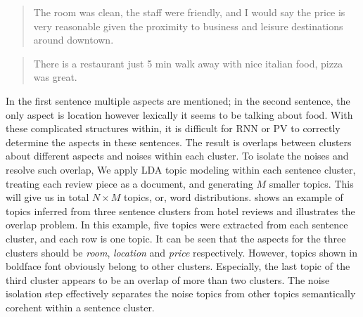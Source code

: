 \begin{quote}
The room was clean, the staff were friendly, and I would say the price is very reasonable given the proximity to business and leisure destinations around downtown.
\end{quote}

\begin{quote}
There is a restaurant just 5 min walk away with nice italian food, pizza was great.
\end{quote}

In the first sentence multiple aspects are mentioned; in the second sentence, the only aspect is location however lexically it seems to be talking about food.
With these complicated structures within, 
it is difficult for RNN or PV to correctly determine the aspects 
in these sentences. The result is overlaps between clusters about 
different aspects and noises within each cluster.
To isolate the noises and resolve such overlap, 
We apply LDA \cite{blei2003latent} topic modeling within each sentence cluster, 
treating each review piece as a document, and generating $M$ smaller topics. 
This will give us in total $N\times M$ topics, or, word distributions. 
 shows an example of topics inferred from three
sentence clusters from hotel reviews and illustrates the overlap problem.
In this example, five topics were extracted from each sentence cluster, 
and each row is one topic. It can be seen that the aspects for the 
three clusters should be {\em room}, {\em location} and {\em price} 
respectively.
However, topics shown in boldface font obviously belong to 
other clusters.  Especially, the last topic of the third cluster 
appears to be an overlap of more than two clusters.
The noise isolation step effectively separates the noise topics from other
topics semantically corehent within a sentence cluster.


